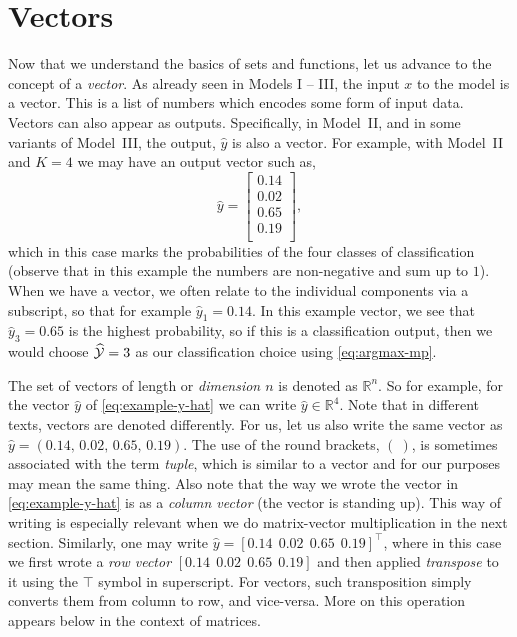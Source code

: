 \documentclass[12pt]{article}
\begin{document}
\section{Vectors}
\label{sec:vectors}
Now that we understand the basics of sets and functions, let us advance to the concept of a {\em vector}. As already seen in Models I -- III, the input $x$ to the model is a vector. This is a list of numbers which encodes some form of input data. Vectors can also appear as outputs. Specifically, in Model~II, and in some variants of Model~III, the output, $\hat{y}$ is also a vector. For example, with Model~II and $K=4$ we may have an output vector such as,
%
\begin{equation}
\label{eq:example-y-hat}
\hat{y} =
\begin{bmatrix}
0.14 \\
0.02\\
0.65 \\
0.19\\
\end{bmatrix},
\end{equation}
%
which in this case marks the probabilities of the four classes of classification (observe that in this example the numbers are non-negative and sum up to $1$). When we have a vector, we often relate to the individual components via a subscript, so that for example $\hat{y}_1 = 0.14$. In this example vector, we see that $\hat{y}_3 = 0.65$ is the highest probability, so if this is a classification output, then we would choose $\widehat{\cal Y} = 3$ as our classification choice using \eqref{eq:argmax-mp}.

The set of vectors of length or {\em dimension $n$} is denoted as ${\mathbb R}^n$. So for example, for the vector $\hat{y}$ of \eqref{eq:example-y-hat} we can write $\hat{y} \in {\mathbb R}^4$. Note that in different texts, vectors are denoted differently. For us, let us also write the same vector as $\hat{y} = (0.14,\, 0.02,\, 0.65,\, 0.19)$. The use of the round brackets, $(~)$, is sometimes associated with the term {\em tuple}, which is similar to a vector and for our purposes may mean the same thing. Also note that the way we wrote the vector in \eqref{eq:example-y-hat} is as a {\em column vector} (the vector is standing up). This way of writing is especially relevant when we do matrix-vector multiplication in the next section. Similarly, one may write $\hat{y} = [ 0.14~~ 0.02~~0.65~~0.19]^\top$, where in this case we first wrote a {\em row vector} $[ 0.14~~ 0.02~~ 0.65~~ 0.19]$ and then applied {\em transpose} to it using the $\top$ symbol in superscript. For vectors, such transposition simply converts them from column to row, and vice-versa. More on this operation appears below in the context of matrices.
\end{document}
